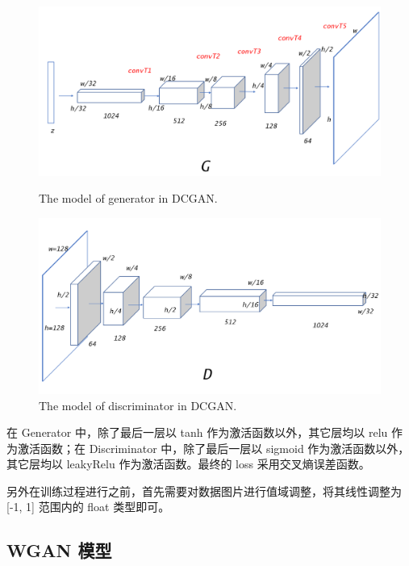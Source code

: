 \documentclass{article}
\begin{document}
\begin{CJK*}{UTF8}{gbsn}
	\begin{figure}[htbp]
		\begin{minipage}{0.5\linewidth}
			\label{fig_dcgan_model}
			\centering\includegraphics[scale=0.13]{res/DCGAN_generator.png}
			\caption{The model of generator in DCGAN.}
		\end{minipage}
		\begin{minipage}{0.5\linewidth}
			\centering\includegraphics[scale=0.13]{res/DCGAN_discriminator.png}
			\caption{The model of discriminator in DCGAN.}
		\end{minipage}
	\end{figure}
	
	在 Generator 中，除了最后一层以 tanh 作为激活函数以外，其它层均以 relu 作为激活函数；在 Discriminator 中，除了最后一层以 sigmoid 作为激活函数以外，其它层均以 leakyRelu 作为激活函数。最终的 loss 采用交叉熵误差函数。
	
	另外在训练过程进行之前，首先需要对数据图片进行值域调整，将其线性调整为 [-1, 1] 范围内的 float 类型即可。
	
  
  \subsection{WGAN 模型}


\end{CJK*}
\end{document}
